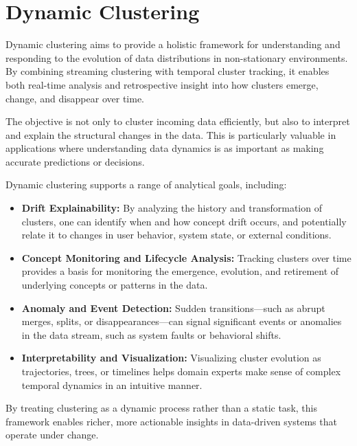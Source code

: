 \section{Dynamic Clustering}\label{sec:dynamic_clustering}

Dynamic clustering aims to provide a holistic framework for understanding and
responding to the evolution of data distributions in non-stationary
environments. By combining streaming clustering with temporal cluster tracking,
it enables both real-time analysis and retrospective insight into how clusters
emerge, change, and disappear over time.

The objective is not only to cluster incoming data efficiently, but also to
interpret and explain the structural changes in the data. This is particularly
valuable in applications where understanding data dynamics is as important as
making accurate predictions or decisions.

Dynamic clustering supports a range of analytical goals, including:

\begin{itemize}
    \item \textbf{Drift Explainability:} By analyzing the history and transformation of
          clusters, one can identify when and how concept drift occurs, and potentially
          relate it to changes in user behavior, system state, or external conditions.

    \item \textbf{Concept Monitoring and Lifecycle Analysis:} Tracking clusters over time
          provides a basis for monitoring the emergence, evolution, and retirement of
          underlying concepts or patterns in the data.

    \item \textbf{Anomaly and Event Detection:} Sudden transitions—such as abrupt merges,
          splits, or disappearances—can signal significant events or anomalies in the data stream,
          such as system faults or behavioral shifts.

    \item \textbf{Interpretability and Visualization:} Visualizing cluster evolution as
          trajectories, trees, or timelines helps domain experts make sense of complex temporal
          dynamics in an intuitive manner.
\end{itemize}

By treating clustering as a dynamic process rather than a static task, this
framework enables richer, more actionable insights in data-driven systems that
operate under change.